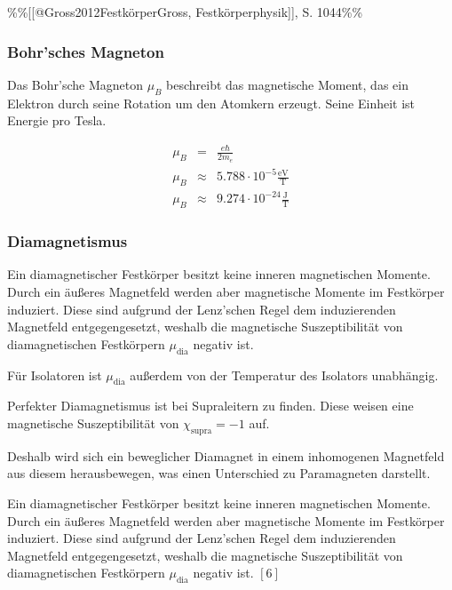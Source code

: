 \documentclass[12pt,a4paper]{scrartcl}
\numberwithin{equation}{section} %
\newcommand{\pu}[1]{\ensuremath{\mathrm{#1}}}
\renewcommand{\[}{} %
\renewcommand{\]}{\noindent} %
\begin{document}
\%\%{[}{[}@Gross2012Festkörper\textbar Gross, Festkörperphysik{]}{]}, S.
1044\%\%

\hypertarget{bohrsches-magneton}{%
\subsubsection{Bohr'sches Magneton}\label{bohrsches-magneton}}

Das Bohr'sche Magneton \(\mu_B\) beschreibt das magnetische Moment, das
ein Elektron durch seine Rotation um den Atomkern erzeugt. Seine Einheit
ist Energie pro Tesla.

\[
\begin{eqnarray}
    \mu_B &=& \frac{e\hbar}{2m_e} \\
    \mu_B &\approx& \pu{5.788 \cdot 10^{-5} \frac{eV}{T}} \\
    \mu_B &\approx& \pu{9.274 \cdot 10^{-24} \frac{J}{T}}
\end{eqnarray}
\]

\hypertarget{diamagnetismus}{%
\subsubsection{Diamagnetismus}\label{diamagnetismus}}

Ein diamagnetischer Festkörper besitzt keine inneren magnetischen
Momente. Durch ein äußeres Magnetfeld werden aber magnetische Momente im
Festkörper induziert. Diese sind aufgrund der Lenz'schen Regel dem
induzierenden Magnetfeld entgegengesetzt, weshalb die magnetische
Suszeptibilität von diamagnetischen Festkörpern \(\mu_\mathrm{dia}\)
negativ ist.

Für Isolatoren ist \(\mu_\mathrm{dia}\) außerdem von der Temperatur des
Isolators unabhängig.

Perfekter Diamagnetismus ist bei Supraleitern zu finden. Diese weisen
eine magnetische Suszeptibilität von \(\chi_\mathrm{supra} = -1\) auf.

Deshalb wird sich ein beweglicher Diamagnet in einem inhomogenen
Magnetfeld aus diesem herausbewegen, was einen Unterschied zu
Paramagneten darstellt.

Ein diamagnetischer Festkörper besitzt keine inneren magnetischen
Momente. Durch ein äußeres Magnetfeld werden aber magnetische Momente im
Festkörper induziert. Diese sind aufgrund der Lenz'schen Regel dem
induzierenden Magnetfeld entgegengesetzt, weshalb die magnetische
Suszeptibilität von diamagnetischen Festkörpern \(\mu_\mathrm{dia}\)
negativ ist. \([6]\)
\end{document}
